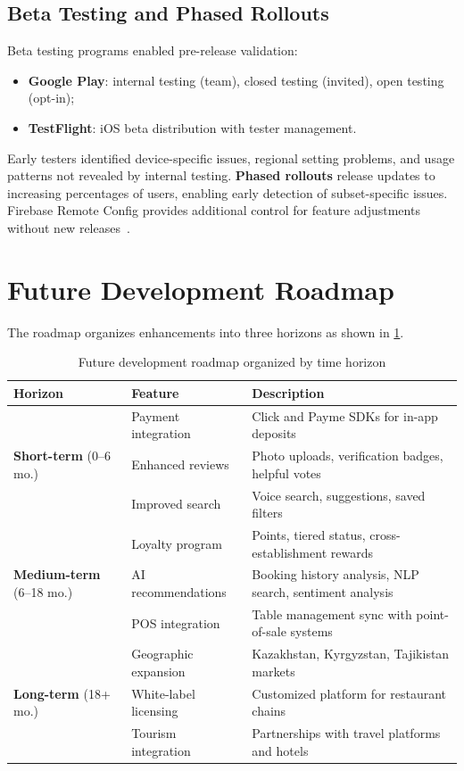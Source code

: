 \subsection{Beta Testing and Phased Rollouts}
\label{subsec:beta-rollout}

Beta testing programs enabled pre-release validation:
\begin{itemize}
  \item \textbf{Google Play}: internal testing (team), closed testing (invited), open testing (opt-in);
  \item \textbf{TestFlight}: iOS beta distribution with tester management.
\end{itemize}

Early testers identified device-specific issues, regional setting problems, and usage patterns not revealed by internal testing.
\textbf{Phased rollouts} release updates to increasing percentages of users, enabling early detection of subset-specific issues.
Firebase Remote Config provides additional control for feature adjustments without new releases~\cite{firebase_functions2024}.


\section{Future Development Roadmap}
\label{sec:roadmap}

The roadmap organizes enhancements into three horizons as shown in \cref{tab:roadmap}.

\begin{table}[htbp]
\caption{Future development roadmap organized by time horizon}
\label{tab:roadmap}
\centering
\small
\begin{tabular}{lp{4cm}p{5.5cm}}
\toprule
\textbf{Horizon} & \textbf{Feature} & \textbf{Description} \\
\midrule
\multirow{3}{*}{\textbf{Short-term} (0--6 mo.)}
  & Payment integration  & Click and Payme SDKs for in-app deposits \\
  & Enhanced reviews     & Photo uploads, verification badges, helpful votes \\
  & Improved search      & Voice search, suggestions, saved filters \\
\midrule
\multirow{3}{*}{\textbf{Medium-term} (6--18 mo.)}
  & Loyalty program      & Points, tiered status, cross-establishment rewards \\
  & AI recommendations   & Booking history analysis, NLP search, sentiment analysis \\
  & POS integration      & Table management sync with point-of-sale systems \\
\midrule
\multirow{3}{*}{\textbf{Long-term} (18+ mo.)}
  & Geographic expansion & Kazakhstan, Kyrgyzstan, Tajikistan markets \\
  & White-label licensing & Customized platform for restaurant chains \\
  & Tourism integration  & Partnerships with travel platforms and hotels \\
\bottomrule
\end{tabular}
\end{table}

